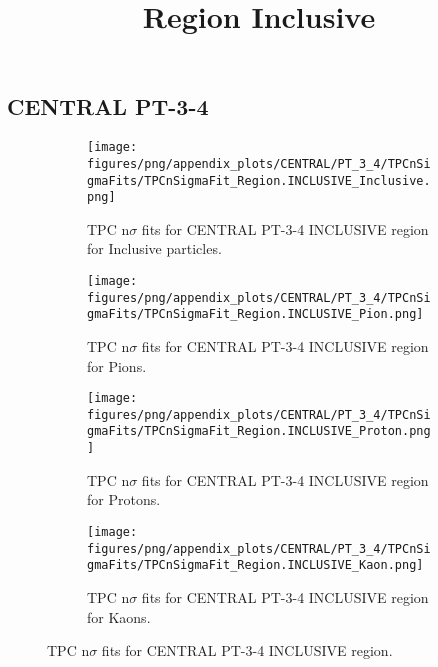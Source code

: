             \subsection{CENTRAL PT-3-4}
            \begin{figure}[H]
                \title{Region Inclusive}
                \begin{subfigure}[b]{0.5\textwidth}
                    \centering
                    \texttt{[image: figures/png/appendix\_plots/CENTRAL/PT\_3\_4/TPCnSigmaFits/TPCnSigmaFit\_Region.INCLUSIVE\_Inclusive.png]}
                    \caption{TPC n$\sigma$ fits for CENTRAL PT-3-4 INCLUSIVE region for Inclusive particles.}
                    \label{fig:appendix_CENTRAL_PT-3-4_INCLUSIVE_Inclusive}
                \end{subfigure}
                \begin{subfigure}[b]{0.5\textwidth}
                    \centering
                    \texttt{[image: figures/png/appendix\_plots/CENTRAL/PT\_3\_4/TPCnSigmaFits/TPCnSigmaFit\_Region.INCLUSIVE\_Pion.png]}
                    \caption{TPC n$\sigma$ fits for CENTRAL PT-3-4 INCLUSIVE region for Pions.}
                    \label{fig:appendix_CENTRAL_PT-3-4_INCLUSIVE_Pion}
                \end{subfigure}
                \begin{subfigure}[b]{0.5\textwidth}
                    \centering
                    \texttt{[image: figures/png/appendix\_plots/CENTRAL/PT\_3\_4/TPCnSigmaFits/TPCnSigmaFit\_Region.INCLUSIVE\_Proton.png]}
                    \caption{TPC n$\sigma$ fits for CENTRAL PT-3-4 INCLUSIVE region for Protons.}
                    \label{fig:appendix_CENTRAL_PT-3-4_INCLUSIVE_Proton}
                \end{subfigure}
                \begin{subfigure}[b]{0.5\textwidth}
                    \centering
                    \texttt{[image: figures/png/appendix\_plots/CENTRAL/PT\_3\_4/TPCnSigmaFits/TPCnSigmaFit\_Region.INCLUSIVE\_Kaon.png]}
                    \caption{TPC n$\sigma$ fits for CENTRAL PT-3-4 INCLUSIVE region for Kaons.}
                    \label{fig:appendix_CENTRAL_PT-3-4_INCLUSIVE_Kaon}
                \end{subfigure}
                \caption{TPC n$\sigma$ fits for CENTRAL PT-3-4 INCLUSIVE region.}
                \label{fig:appendix_CENTRAL_PT-3-4_INCLUSIVE}
            \end{figure}

